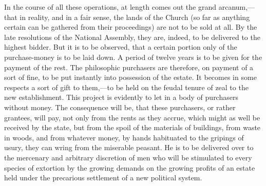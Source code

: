 In the course of all these operations, at length comes out the grand arcanum,—that in reality, and in a fair sense, the lands of the Church (so far as anything certain can be gathered from their proceedings) are not to be sold at all. By the late resolutions of the National Assembly, they are, indeed, to be delivered to the highest bidder. But it is to be observed, that a certain portion only of the purchase-money is to be laid down. A period of twelve years is to be given for the payment of the rest. The philosophic purchasers are therefore, on payment of a sort of fine, to be put instantly into possession of the estate. It becomes in some respects a sort of gift to them,—to be held on the feudal tenure of zeal to the new establishment. This project is evidently to let in a body of purchasers without money. The consequence will be, that these purchasers, or rather grantees, will pay, not only from the rents as they accrue, which might as well be received by the state, but from the spoil of the materials of buildings, from waste in woods, and from whatever money, by hands habituated to the gripings of usury, they can wring from the miserable peasant. He is to be delivered over to the mercenary and arbitrary discretion of men who will be stimulated to every species of extortion by the growing demands on the growing profits of an estate held under the precarious settlement of a new political system.

